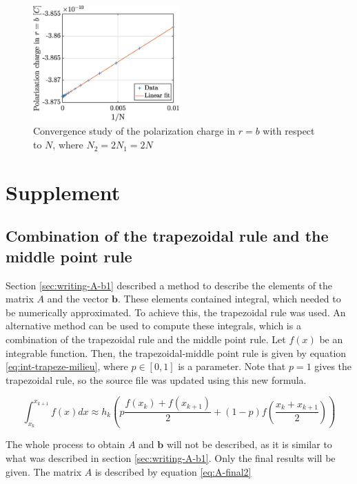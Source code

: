 \documentclass[a4paper,12pt,twoside]{article}
\newcommand{\mbf}[1]{\mathbf{#1}} %
\newcommand{\bracket}[1]{\left(#1\right)}
\begin{document}
  \begin{figure}
    \centering
    \includegraphics[width=0.5\textwidth]{graphs/exdii-conv-polch.eps}
    \caption{Convergence study of the polarization charge in $r=b$ with respect to $N$, where $N_2 = 2N_1 =2N$}
    \label{fig:exdii-conv-polch}
  \end{figure}


  \section{Supplement} %
    \subsection{Combination of the trapezoidal rule and the middle point rule} \label{sec:trapezoidal-middle-rule}
      Section \ref{sec:writing-A-b1} described a method to describe the elements of the matrix $A$ and the vector $\mbf{b}$.
      These elements contained integral, which needed to be numerically approximated.
      To achieve this, the trapezoidal rule was used.
      An alternative method can be used to compute these integrals, which is a combination of the trapezoidal rule and the middle point rule.
      Let $f\bracket{x}$ be an integrable function.
      Then, the trapezoidal-middle point rule is given by equation \eqref{eq:int-trapeze-milieu}, where $p\in[0,1]$ is a parameter.
      Note that $p=1$ gives the trapezoidal rule, so the source file was updated using this new formula.

      \begin{equation}
        \int_{x_k}^{x_{k+1}}f\bracket{x}dx \approx h_k\bracket{p\frac{f\bracket{x_k} + f\bracket{x_{k+1}}}{2} + \bracket{1-p}f\bracket{\frac{x_k + x_{k+1}}{2}}}
        \label{eq:int-trapeze-milieu}
      \end{equation}

      The whole process to obtain $A$ and $\mbf{b}$ will not be described, as it is similar to what was described in section \ref{sec:writing-A-b1}.
      Only the final results will be given.
      The matrix $A$ is described by equation \eqref{eq:A-final2}%
\end{document}
